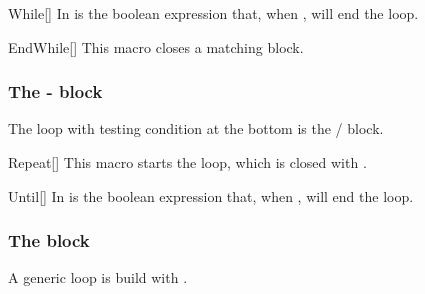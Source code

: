 \documentclass[a4paper, 11pt]{article}
\begin{document}
\begin{tcblisting}{}
    \begin{algorithmic}
        \EndWhile
    \end{algorithmic}
\end{tcblisting}

\begin{macro}{While}[]
    In  is the boolean expression that, when \False, will end the loop.

    \BlockOptionsText
\end{macro}

\begin{macro}{EndWhile}[]
    This macro closes a matching  block.

    \MacroOptionsText
\end{macro}

\subsubsection{The - block}
The loop with testing condition at the bottom is the / block.

\begin{tcblisting}{}
    \begin{algorithmic}
        \Repeat
    \end{algorithmic}
\end{tcblisting}

\begin{macro}{Repeat}[]
    This macro starts the  loop, which is closed with .

    \BlockOptionsText
\end{macro}

\begin{macro}{Until}[]
    In  is the boolean expression that, when , will end the loop.

    \MacroOptionsText
\end{macro}

\subsubsection{The  block}
A generic loop is build with .
\end{document}
